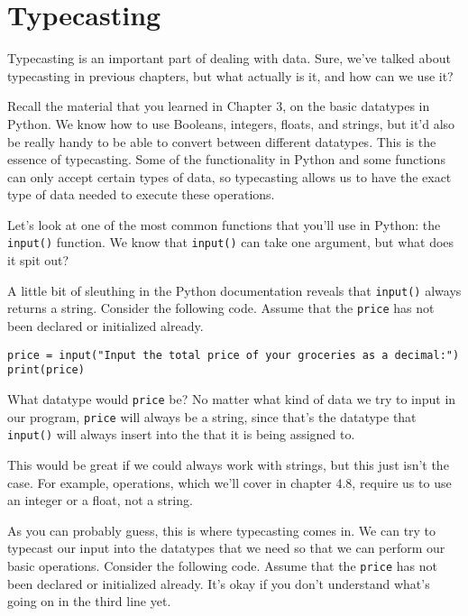 \section{Typecasting}
Typecasting is an important part of dealing with data. Sure, we've talked about typecasting in previous chapters, but what actually is it, and how can we use it?\par
Recall the material that you learned in Chapter 3, on the basic datatypes in Python. We know how to use Booleans, integers, floats, and strings, but it'd also be really handy to be able to convert between different datatypes. This is the essence of typecasting. Some of the functionality in Python and some functions can only accept certain types of data, so typecasting allows us to have the exact type of data needed to execute these operations.\par
Let's look at one of the most common functions that you'll use in Python: the \verb|input()| function. We know that \verb|input()| can take one argument, but what does it spit out?\par
A little bit of sleuthing in the Python documentation reveals that \verb|input()| always returns a string. Consider the following code. Assume that the  \verb|price| has not been declared or initialized already.
\begin{lstlisting}[style=pippython]
price = input("Input the total price of your groceries as a decimal:")
print(price)
\end{lstlisting}
What datatype would \verb|price| be? No matter what kind of data we try to input in our program, \verb|price| will always be a string, since that's the datatype that \verb|input()| will always insert into the  that it is being assigned to.\par
This would be great if we could always work with strings, but this just isn't the case. For example,  operations, which we'll cover in chapter 4.8, require us to use an integer or a float, not a string.\par
As you can probably guess, this is where typecasting comes in. We can try to typecast our input into the datatypes that we need so that we can perform our basic  operations. Consider the following code. Assume that the  \verb|price| has not been declared or initialized already. It's okay if you don't understand what's going on in the third line yet.\par
